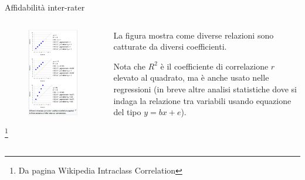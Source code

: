 \documentclass[
  ignorenonframetext,
]{beamer}
\begin{document}
\begin{frame}{Affidabilità inter-rater}
\label{affidabilituxe0-inter-rater-3}
\begin{columns}
  \begin{column}{0.5\textwidth}
    \begin{figure}
    \includegraphics[scale=0.2]{Figures/wiki_ICC.png}
    \end{figure}
    \footnote{Da pagina Wikipedia Intraclass Correlation}
  \end{column}
  \begin{column}{0.5\textwidth}
    La figura mostra come diverse relazioni sono catturate da diversi coefficienti.
    
    Nota che $R^2$ è il coefficiente di correlazione $r$ elevato al quadrato, ma è anche usato nelle regressioni (in breve altre analisi statistiche dove si indaga la relazione tra variabili usando equazione del tipo $y = bx + e$).
  \end{column}
\end{columns}
\end{frame}
\end{document}
